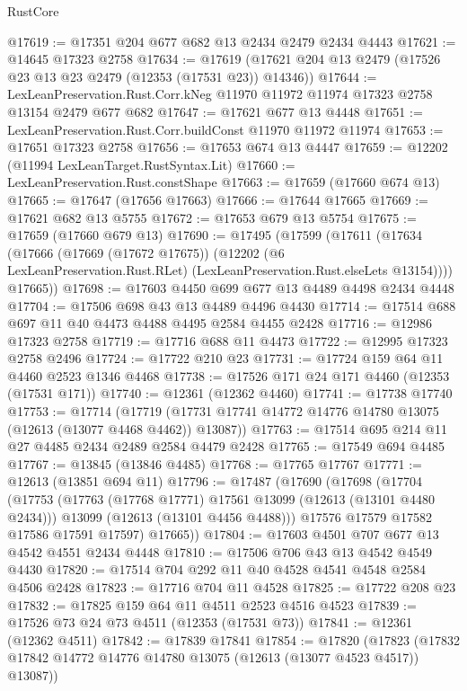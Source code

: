 \begin{lexlean}{RustCore}
\begin{coremodule}
@17619 := @17351 @204 @677 @682 @13 @2434 @2479 @2434 @4443
@17621 := @14645 @17323 @2758
@17634 := @17619 (@17621 @204 @13 @2479 (@17526 @23 @13 @23 @2479 (@12353 (@17531 @23)) @14346))
@17644 := LexLeanPreservation.Rust.Corr.kNeg
    @11970
    @11972
    @11974
    @17323
    @2758
    @13154
    @2479
    @677
    @682
@17647 := @17621 @677 @13 @4448
@17651 := LexLeanPreservation.Rust.Corr.buildConst @11970 @11972 @11974
@17653 := @17651 @17323 @2758
@17656 := @17653 @674 @13 @4447
@17659 := @12202 (@11994 LexLeanTarget.RustSyntax.Lit)
@17660 := LexLeanPreservation.Rust.constShape
@17663 := @17659 (@17660 @674 @13)
@17665 := @17647 (@17656 @17663)
@17666 := @17644 @17665
@17669 := @17621 @682 @13 @5755
@17672 := @17653 @679 @13 @5754
@17675 := @17659 (@17660 @679 @13)
@17690 := @17495
    (@17599
      (@17611
        (@17634
          (@17666
            (@17669 (@17672 @17675))
            (@12202 (@6 LexLeanPreservation.Rust.RLet) (LexLeanPreservation.Rust.elseLets @13154))))
        @17665))
@17698 := @17603 @4450 @699 @677 @13 @4489 @4498 @2434 @4448
@17704 := @17506 @698 @43 @13 @4489 @4496 @4430
@17714 := @17514 @688 @697 @11 @40 @4473 @4488 @4495 @2584 @4455 @2428
@17716 := @12986 @17323 @2758
@17719 := @17716 @688 @11 @4473
@17722 := @12995 @17323 @2758 @2496
@17724 := @17722 @210 @23
@17731 := @17724 @159 @64 @11 @4460 @2523 @1346 @4468
@17738 := @17526 @171 @24 @171 @4460 (@12353 (@17531 @171))
@17740 := @12361 (@12362 @4460)
@17741 := @17738 @17740
@17753 := @17714
    (@17719 (@17731 @17741 @14772 @14776 @14780 @13075 (@12613 (@13077 @4468 @4462)) @13087))
@17763 := @17514 @695 @214 @11 @27 @4485 @2434 @2489 @2584 @4479 @2428
@17765 := @17549 @694 @4485
@17767 := @13845 (@13846 @4485)
@17768 := @17765 @17767
@17771 := @12613 (@13851 @694 @11)
@17796 := @17487
    (@17690
      (@17698
        (@17704
          (@17753
            (@17763 (@17768 @17771) @17561 @13099 (@12613 (@13101 @4480 @2434)))
            @13099
            (@12613 (@13101 @4456 @4488)))
          @17576
          @17579
          @17582
          @17586
          @17591
          @17597)
        @17665))
@17804 := @17603 @4501 @707 @677 @13 @4542 @4551 @2434 @4448
@17810 := @17506 @706 @43 @13 @4542 @4549 @4430
@17820 := @17514 @704 @292 @11 @40 @4528 @4541 @4548 @2584 @4506 @2428
@17823 := @17716 @704 @11 @4528
@17825 := @17722 @208 @23
@17832 := @17825 @159 @64 @11 @4511 @2523 @4516 @4523
@17839 := @17526 @73 @24 @73 @4511 (@12353 (@17531 @73))
@17841 := @12361 (@12362 @4511)
@17842 := @17839 @17841
@17854 := @17820
    (@17823 (@17832 @17842 @14772 @14776 @14780 @13075 (@12613 (@13077 @4523 @4517)) @13087))

\end{coremodule}
\end{lexlean}
